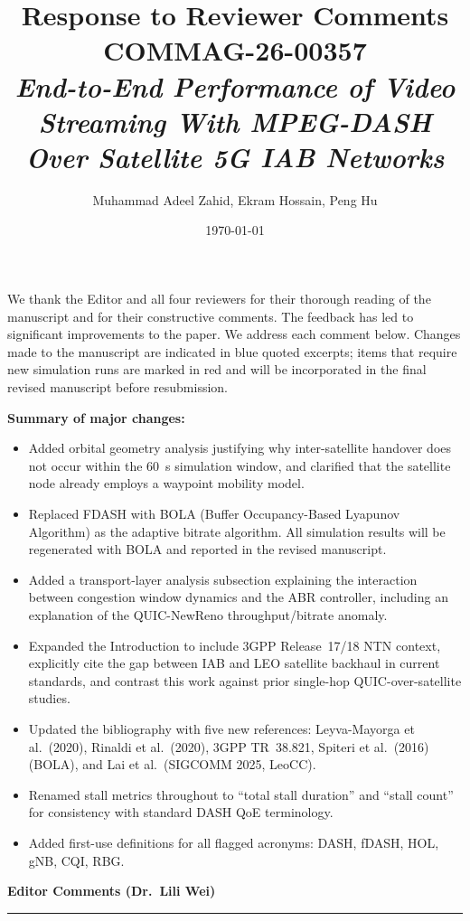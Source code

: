 \documentclass[11pt]{article}
\title{\textbf{Response to Reviewer Comments}\\[0.5em]
\large COMMAG-26-00357\\
\normalsize \textit{End-to-End Performance of Video Streaming With MPEG-DASH Over Satellite 5G IAB Networks}}
\author{Muhammad Adeel Zahid, Ekram Hossain, Peng Hu}
\date{\today}
\newcommand{\reviewer}[1]{\vspace{1em}\noindent\textbf{\large #1}\vspace{0.4em}\hrule\vspace{0.6em}}
\begin{document}
\maketitle

\noindent We thank the Editor and all four reviewers for their thorough reading of the manuscript and for their constructive comments. The feedback has led to significant improvements to the paper. We address each comment below. Changes made to the manuscript are indicated in blue quoted excerpts; items that require new simulation runs are marked in red and will be incorporated in the final revised manuscript before resubmission.

\bigskip
\noindent\textbf{Summary of major changes:}
\begin{itemize}[noitemsep]
  \item Added orbital geometry analysis justifying why inter-satellite handover does not occur within the 60~s simulation window, and clarified that the satellite node already employs a waypoint mobility model.
  \item Replaced FDASH with BOLA (Buffer Occupancy-Based Lyapunov Algorithm) as the adaptive bitrate algorithm. All simulation results will be regenerated with BOLA and reported in the revised manuscript.
  \item Added a transport-layer analysis subsection explaining the interaction between congestion window dynamics and the ABR controller, including an explanation of the QUIC-NewReno throughput/bitrate anomaly.
  \item Expanded the Introduction to include 3GPP Release~17/18 NTN context, explicitly cite the gap between IAB and LEO satellite backhaul in current standards, and contrast this work against prior single-hop QUIC-over-satellite studies.
  \item Updated the bibliography with five new references: Leyva-Mayorga et al.\ (2020), Rinaldi et al.\ (2020), 3GPP TR~38.821, Spiteri et al.\ (2016) (BOLA), and Lai et al.\ (SIGCOMM 2025, LeoCC).
  \item Renamed stall metrics throughout to ``total stall duration'' and ``stall count'' for consistency with standard DASH QoE terminology.
  \item Added first-use definitions for all flagged acronyms: DASH, fDASH, HOL, gNB, CQI, RBG.
\end{itemize}

\reviewer{Editor Comments (Dr.\ Lili Wei)}
\end{document}
